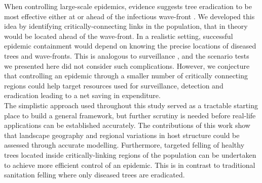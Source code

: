 When controlling large-scale epidemics, evidence suggests tree eradication to be most effective either at or ahead of the infectious wave-front \cite{large-scale-control}. We developed this idea by identifying critically-connecting links in the population, that in theory would be located ahead of the wave-front. In a realistic setting, successful epidemic containment would depend on knowing the precise locations of diseased trees and wave-fronts. This is analogous to surveillance \cite{surveillance-review, doi:10.1098/rspb.2015.1478}, and the scenario tests we presented here did not consider such complications. However, we conjecture that controlling an epidemic through a smaller number of critically connecting regions could help target resources used for surveillance, detection and eradication leading to a net saving in expenditure.\\

The simplistic approach used throughout this study served as a tractable starting place to build a general framework, but further scrutiny is needed before real-life applications can be established accurately. The contributions of this work show that landscape geography and regional variations in host structure could be assessed through accurate modelling. Furthermore, targeted felling of healthy trees located inside critically-linking regions of the population can be undertaken to achieve more efficient control of an epidemic. This is in contrast to traditional sanitation felling where only diseased trees are eradicated.


